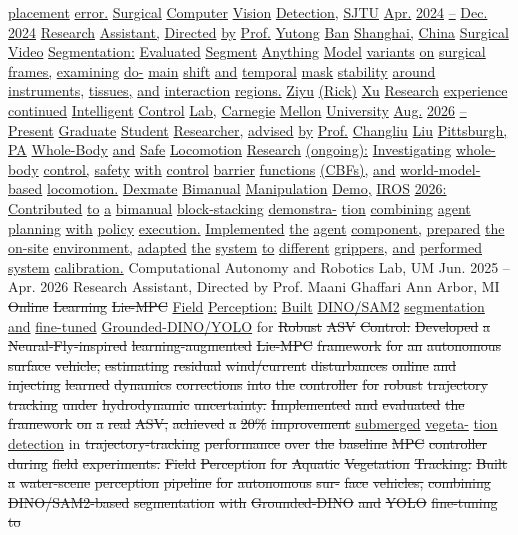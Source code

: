\documentclass[10pt,letterpaper]{article}
\newcommand{\del}[1]{{\color{red}\sout{#1}}}
\newcommand{\add}[1]{{\color{blue}\uline{#1}}}
\begin{document}
\add{placement} \add{error.} \add{Surgical} \add{Computer} \add{Vision} \add{Detection,} \add{SJTU} \add{Apr.} \add{2024} \add{--} \add{Dec.} \add{2024} \add{Research} \add{Assistant,} \add{Directed} \add{by} \add{Prof.} \add{Yutong} \add{Ban} \add{Shanghai,} \add{China} \add{} \add{Surgical} \add{Video} \add{Segmentation:} \add{Evaluated} \add{Segment} \add{Anything} \add{Model} \add{variants} \add{on} \add{surgical} \add{frames,} \add{examining} \add{do-} \add{main} \add{shift} \add{and} \add{temporal} \add{mask} \add{stability} \add{around} \add{instruments,} \add{tissues,} \add{and} \add{interaction} \add{regions.} \add{Ziyu} \add{(Rick)} \add{Xu} \add{Research} \add{experience} \add{continued} \add{Intelligent} \add{Control} \add{Lab,} \add{Carnegie} \add{Mellon} \add{University} \add{Aug.} \add{2026} \add{--} \add{Present} \add{Graduate} \add{Student} \add{Researcher,} \add{advised} \add{by} \add{Prof.} \add{Changliu} \add{Liu} \add{Pittsburgh,} \add{PA} \add{} \add{Whole-Body} \add{and} \add{Safe} \add{Locomotion} \add{Research} \add{(ongoing):} \add{Investigating} \add{whole-body} \add{control,} \add{safety} \add{with} \add{control} \add{barrier} \add{functions} \add{(CBFs),} \add{and} \add{world-model-based} \add{locomotion.} \add{} \add{Dexmate} \add{Bimanual} \add{Manipulation} \add{Demo,} \add{IROS} \add{2026:} \add{Contributed} \add{to} \add{a} \add{bimanual} \add{block-stacking} \add{demonstra-} \add{tion} \add{combining} \add{agent} \add{planning} \add{with} \add{policy} \add{execution.} \add{Implemented} \add{the} \add{agent} \add{component,} \add{prepared} \add{the} \add{on-site} \add{environment,} \add{adapted} \add{the} \add{system} \add{to} \add{different} \add{grippers,} \add{and} \add{performed} \add{system} \add{calibration.} Computational Autonomy and Robotics Lab, UM Jun. 2025 -- Apr. 2026 Research Assistant, Directed by Prof. Maani Ghaffari Ann Arbor, MI  \del{Online} \del{Learning} \del{Lie-MPC} \add{Field} \add{Perception:} \add{Built} \add{DINO/SAM2} \add{segmentation} \add{and} \add{fine-tuned} \add{Grounded-DINO/YOLO} for \del{Robust} \del{ASV} \del{Control:} \del{Developed} \del{a} \del{Neural-Fly-inspired} \del{learning-augmented} \del{Lie-MPC} \del{framework} \del{for} \del{an} \del{autonomous} \del{surface} \del{vehicle,} \del{estimating} \del{residual} \del{wind/current} \del{disturbances} \del{online} \del{and} \del{injecting} \del{learned} \del{dynamics} \del{corrections} \del{into} \del{the} \del{controller} \del{for} \del{robust} \del{trajectory} \del{tracking} \del{under} \del{hydrodynamic} \del{uncertainty.} \del{Implemented} \del{and} \del{evaluated} \del{the} \del{framework} \del{on} \del{a} \del{real} \del{ASV,} \del{achieved} \del{a} \del{20\%} \del{improvement} \add{submerged} \add{vegeta-} \add{tion} \add{detection} in \del{trajectory-tracking} \del{performance} \del{over} \del{the} \del{baseline} \del{MPC} \del{controller} \del{during} \del{field} \del{experiments.} \del{} \del{Field} \del{Perception} \del{for} \del{Aquatic} \del{Vegetation} \del{Tracking:} \del{Built} \del{a} \del{water-scene} \del{perception} \del{pipeline} \del{for} \del{autonomous} \del{sur-} \del{face} \del{vehicles,} \del{combining} \del{DINO/SAM2-based} \del{segmentation} \del{with} \del{Grounded-DINO} \del{and} \del{YOLO} \del{fine-tuning} \del{to} 
\end{document}
